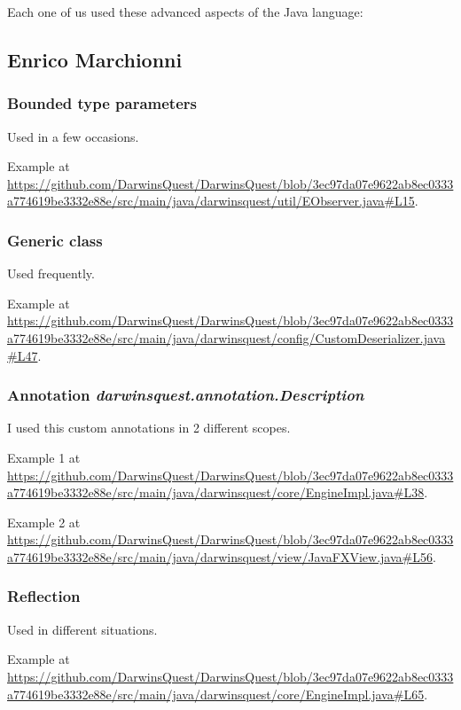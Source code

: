 \documentclass[12pt, a4paper]{report}
\theoremstyle{definition}
\begin{document}
    Each one of us used these advanced aspects of the Java language:

    \subsection*{Enrico Marchionni}

        \subsubsection{Bounded type parameters}

        Used in a few occasions.

        Example at \url{https://github.com/DarwinsQuest/DarwinsQuest/blob/3ec97da07e9622ab8ec0333a774619be3332e88e/src/main/java/darwinsquest/util/EObserver.java#L15}.

        \subsubsection{Generic class}
        
        Used frequently.

        Example at \url{https://github.com/DarwinsQuest/DarwinsQuest/blob/3ec97da07e9622ab8ec0333a774619be3332e88e/src/main/java/darwinsquest/config/CustomDeserializer.java#L47}.

        \subsubsection{Annotation \emph{darwinsquest.annotation.Description}}

        I used this custom annotations in 2 different scopes.

        Example 1 at \url{https://github.com/DarwinsQuest/DarwinsQuest/blob/3ec97da07e9622ab8ec0333a774619be3332e88e/src/main/java/darwinsquest/core/EngineImpl.java#L38}.

        Example 2 at \url{https://github.com/DarwinsQuest/DarwinsQuest/blob/3ec97da07e9622ab8ec0333a774619be3332e88e/src/main/java/darwinsquest/view/JavaFXView.java#L56}.

        \subsubsection{Reflection}

        Used in different situations.

        Example at \url{https://github.com/DarwinsQuest/DarwinsQuest/blob/3ec97da07e9622ab8ec0333a774619be3332e88e/src/main/java/darwinsquest/core/EngineImpl.java#L65}.
\end{document}
